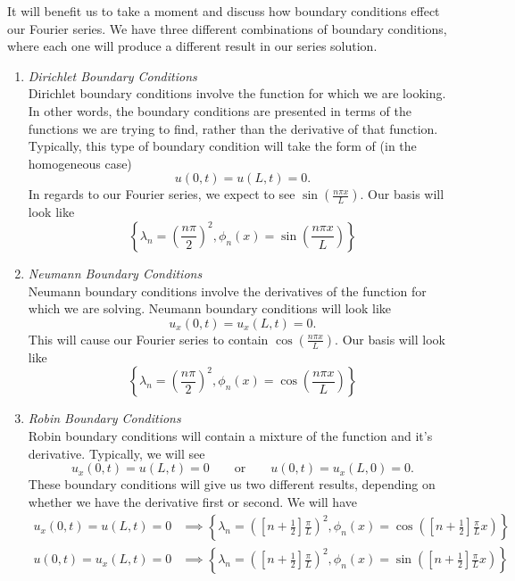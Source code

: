 \documentclass{article}
\begin{document}
\indent It will benefit us to take a moment and discuss how boundary conditions
effect our Fourier series. We have three different combinations of boundary
conditions, where each one will produce a different result in our series solution.
\begin{enumerate}
\item \textit{Dirichlet Boundary Conditions}\\
Dirichlet boundary conditions involve the function for which we are looking. In
other words, the boundary conditions are presented in terms of the functions we
are trying to find, rather than the derivative of that function. Typically, this
type of boundary condition will take the form of (in the homogeneous case)
\[u(0,t) = u(L,t) = 0.\]
In regards to our Fourier series, we expect to see $\sin{(\frac{n\pi x}{L})}$.
Our basis will look like
\[
\left\{ \lambda_{n} = \left(\frac{n\pi}{2}\right)^{2}, \phi_{n}(x) = \sin{\left(\frac{n\pi x}{L}\right)} \right\}
\]
\item \textit{Neumann Boundary Conditions}\\
Neumann boundary conditions involve the derivatives of the function for which we
are solving. Neumann boundary conditions will look like
\[u_{x}(0,t) = u_{x}(L,t) = 0.\]
This will cause our Fourier series to contain $\cos{(\frac{n\pi x}{L})}$. Our
basis will look like
\[
\left\{ \lambda_{n} = \left(\frac{n\pi}{2}\right)^{2}, \phi_{n}(x) = \cos{\left(\frac{n\pi x}{L}\right)} \right\}
\]
\item \textit{Robin Boundary Conditions}\\
Robin boundary conditions will contain a mixture of the function and it's
derivative. Typically, we will see
\[ u_{x}(0,t) = u(L,t) = 0\qquad \text{or}\qquad u(0,t) = u_{x}(L,0) = 0.\]
These boundary conditions will give us two different results, depending on whether
we have the derivative first or second. We will have
\begin{align*}
u_{x}(0,t) = u(L,t) = 0 &\implies \left\{\lambda_{n} = \left(\left[n + \frac{1}{2}\right]\frac{\pi}{L}\right)^{2}, \phi_{n}(x) = \cos{\left(\left[n + \frac{1}{2}\right]\frac{\pi}{L}x\right)}\right\}\\
u(0,t) = u_{x}(L,t) = 0 &\implies \left\{\lambda_{n} = \left(\left[n + \frac{1}{2}\right]\frac{\pi}{L}\right)^{2}, \phi_{n}(x) =\sin{\left(\left[n + \frac{1}{2}\right]\frac{\pi}{L}x\right)}\right\}
\end{align*}
\end{enumerate}
\end{document}
